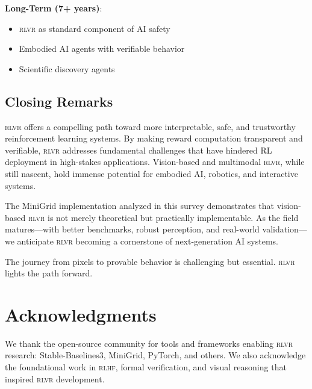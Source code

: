 \documentclass[11pt,a4paper]{article}
\newcommand{\rlvr}{\textsc{rlvr}}
\newcommand{\rlhf}{\textsc{rlhf}}
\begin{document}
\textbf{Long-Term (7+ years)}:
\begin{itemize}[leftmargin=*]
    \item \rlvr{} as standard component of AI safety
    \item Embodied AI agents with verifiable behavior
    \item Scientific discovery agents
\end{itemize}

\subsection{Closing Remarks}

\rlvr{} offers a compelling path toward more interpretable, safe, and trustworthy reinforcement learning systems. By making reward computation transparent and verifiable, \rlvr{} addresses fundamental challenges that have hindered RL deployment in high-stakes applications. Vision-based and multimodal \rlvr{}, while still nascent, hold immense potential for embodied AI, robotics, and interactive systems.

The MiniGrid implementation analyzed in this survey demonstrates that vision-based \rlvr{} is not merely theoretical but practically implementable. As the field matures---with better benchmarks, robust perception, and real-world validation---we anticipate \rlvr{} becoming a cornerstone of next-generation AI systems.

The journey from pixels to provable behavior is challenging but essential. \rlvr{} lights the path forward.


\section*{Acknowledgments}

We thank the open-source community for tools and frameworks enabling \rlvr{} research: Stable-Baselines3, MiniGrid, PyTorch, and others. We also acknowledge the foundational work in \rlhf{}, formal verification, and visual reasoning that inspired \rlvr{} development.

\end{document}
